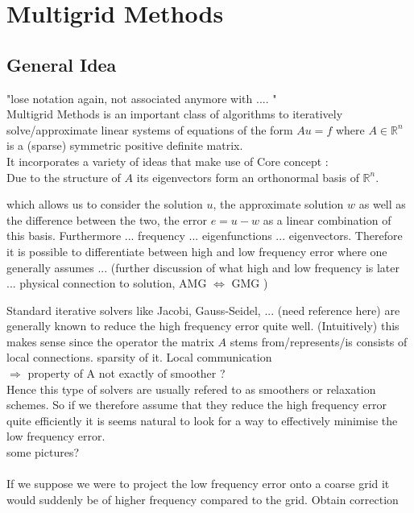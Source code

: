 \documentclass[../draft_1.tex]{subfiles}
\begin{document}
\chapter{Multigrid Methods}

\section{General Idea}
"lose notation again, not associated anymore with .... " \\
Multigrid Methods is an important class of algorithms to iteratively solve/approximate linear systems of equations of the form $Au = f$ where $A \in \mathbb{R}^n$ is a (sparse) symmetric positive definite matrix.  \\

It incorporates a variety of ideas that make use of 
Core concept : \\
Due to the structure of $A$ its eigenvectors form an orthonormal basis of $\mathbb{R}^n$. 



which allows us to consider the solution $u$, the approximate solution $w$ as well as the difference between the two, the error $ e = u - w$ as a linear combination of this basis. Furthermore ... frequency ... eigenfunctions ... eigenvectors. Therefore it is possible to differentiate between high and low frequency error where one generally assumes ... (further discussion of what high and low frequency is later ... physical connection to solution, AMG $ \iff $ GMG )

Standard iterative solvers like Jacobi, Gauss-Seidel, ... (need reference here) are generally known to reduce the high frequency error quite well. (Intuitively) this makes sense since the operator the matrix $A$ stems from/represents/is consists of local connections. sparsity of it. Local communication \\
$\Rightarrow$ property of A not exactly of smoother ? \\ Hence this type of solvers are usually refered to as smoothers or relaxation schemes. 
So if we therefore assume that they reduce the high frequency error quite efficiently it is seems natural to look for a way to effectively minimise the low frequency error. \\ 
some pictures? \\
\\
If we suppose we were to project the low frequency error onto a coarse grid it would suddenly be of higher frequency compared to the grid. Obtain correction
\end{document}
